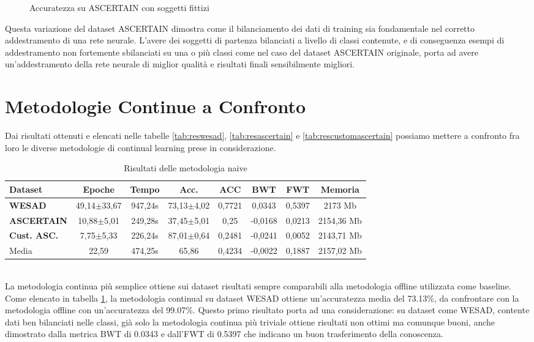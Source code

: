 \begin{figure}[!tbp]
\begin{minipage}[b]{0.5\textwidth}
		\caption{Accuratezza su ASCERTAIN con soggetti fittizi}
		\label{fig:customascertain_accuracy_graph}
	\end{minipage}
\end{figure}
Questa variazione del dataset ASCERTAIN dimostra come il bilanciamento dei dati di training sia fondamentale nel corretto addestramento di una rete neurale. L'avere dei soggetti di partenza bilanciati a livello di classi contenute, e di conseguenza esempi di addestramento non fortemente sbilanciati su una o più classi come nel caso del dataset ASCERTAIN originale, porta ad avere un'addestramento della rete neurale di miglior qualità e risultati finali sensibilmente migliori.
\pagebreak
\section{Metodologie Continue a Confronto}
Dai risultati ottenuti e elencati nelle tabelle \ref{tab:reswesad}, \ref{tab:resascertain} e \ref{tab:rescustomascertain} possiamo mettere a confronto fra loro le diverse metodologie di continual learning prese in considerazione.
\begin{table}[h]
\footnotesize
    \begin{tabular}{l|c|c|c|c|c|c|c}
        \textbf{Dataset} & \textbf{Epoche} & \textbf{Tempo} & \textbf{Acc.} & \textbf{ACC} & \textbf{BWT} & \textbf{FWT} & \textbf{Memoria}\\
        \hline
        \textbf{WESAD} & 49,14$\pm$33,67 & 947,24s & 73,13$\pm$4,02 & 0,7721 & 0,0343 & 0,5397 & 2173 Mb\\
        \textbf{ASCERTAIN} & 10,88$\pm$5,01 & 249,28s & 37,45$\pm$5,01 & 0,25 & -0,0168 & 0,0213 & 2154,36 Mb\\
        \textbf{Cust. ASC.} & 7,75$\pm$5,33 & 226,24s & 87,01$\pm$0,64 & 0,2481 & -0,0241 & 0,0052 & 2143,71 Mb\\
        \hline
        Media & 22,59 & 474,25s & 65,86 & 0,4234 & -0,0022 & 0,1887 & 2157,02 Mb
    \end{tabular}
    \caption{Risultati delle metodologia naive}
    \label{tab:rescontinual}
\end{table}\\
La metodologia continua più semplice ottiene sui dataset risultati sempre comparabili alla metodologia offline utilizzata come baseline. Come elencato in tabella \ref{tab:rescontinual}, la metodologia continual su dataset WESAD ottiene un'accuratezza media del 73.13\%, da confrontare con la metodologia offline con un'accuratezza del 99.07\%. Questo primo risultato porta ad una considerazione: su dataset come WESAD, contente dati ben bilanciati nelle classi, già solo la metodologia continua più triviale ottiene risultati non ottimi ma comunque buoni, anche dimostrato dalla metrica BWT di 0.0343 e dall'FWT di 0.5397 che indicano un buon trasferimento della conoscenza.\\

